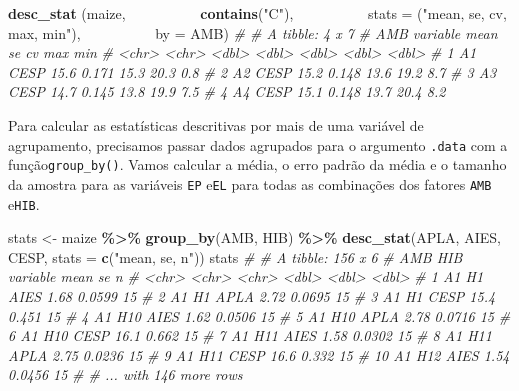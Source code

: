 \documentclass[
]{book}
\makeatletter
\newenvironment{Shaded}{\begin{snugshade}}{\end{snugshade}}
\newcommand{\CommentTok}[1]{\textcolor[rgb]{0.56,0.35,0.01}{\textit{#1}}}
\newcommand{\DataTypeTok}[1]{\textcolor[rgb]{0.13,0.29,0.53}{#1}}
\newcommand{\KeywordTok}[1]{\textcolor[rgb]{0.13,0.29,0.53}{\textbf{#1}}}
\newcommand{\NormalTok}[1]{#1}
\newcommand{\OperatorTok}[1]{\textcolor[rgb]{0.81,0.36,0.00}{\textbf{#1}}}
\newcommand{\StringTok}[1]{\textcolor[rgb]{0.31,0.60,0.02}{#1}}
\numberwithin{equation}{section}
\newcommand{\indf}[1]{\index[function]{#1@\texttt{#1()}|ST}}
\makeatother
\begin{document}
\begin{Shaded}
\begin{Highlighting}[]
\KeywordTok{desc\_stat}\NormalTok{ (maize,}
          \KeywordTok{contains}\NormalTok{(}\StringTok{"C"}\NormalTok{),}
          \DataTypeTok{stats =}\NormalTok{ (}\StringTok{"mean, se, cv, max, min"}\NormalTok{),}
          \DataTypeTok{by =}\NormalTok{ AMB)}
\CommentTok{\# \# A tibble: 4 x 7}
\CommentTok{\#   AMB   variable  mean    se    cv   max   min}
\CommentTok{\#   \textless{}chr\textgreater{} \textless{}chr\textgreater{}    \textless{}dbl\textgreater{} \textless{}dbl\textgreater{} \textless{}dbl\textgreater{} \textless{}dbl\textgreater{} \textless{}dbl\textgreater{}}
\CommentTok{\# 1 A1    CESP      15.6 0.171  15.3  20.3   0.8}
\CommentTok{\# 2 A2    CESP      15.2 0.148  13.6  19.2   8.7}
\CommentTok{\# 3 A3    CESP      14.7 0.145  13.8  19.9   7.5}
\CommentTok{\# 4 A4    CESP      15.1 0.148  13.7  20.4   8.2}
\end{Highlighting}
\end{Shaded}

\indf{desc\_stat}

Para calcular as estatísticas descritivas por mais de uma variável de agrupamento, precisamos passar dados agrupados para o argumento \texttt{.data} com a função\texttt{group\_by()}. Vamos calcular a média, o erro padrão da média e o tamanho da amostra para as variáveis \texttt{EP} e\texttt{EL} para todas as combinações dos fatores \texttt{AMB} e\texttt{HIB}.

\begin{Shaded}
\begin{Highlighting}[]
\NormalTok{stats \textless{}{-}}\StringTok{ }
\NormalTok{maize }\OperatorTok{\%\textgreater{}\%}\StringTok{ }
\StringTok{  }\KeywordTok{group\_by}\NormalTok{(AMB, HIB) }\OperatorTok{\%\textgreater{}\%}\StringTok{ }
\StringTok{  }\KeywordTok{desc\_stat}\NormalTok{(APLA, AIES, CESP,}
            \DataTypeTok{stats =} \KeywordTok{c}\NormalTok{(}\StringTok{"mean, se, n"}\NormalTok{))}
\NormalTok{stats}
\CommentTok{\# \# A tibble: 156 x 6}
\CommentTok{\#    AMB   HIB   variable  mean     se     n}
\CommentTok{\#    \textless{}chr\textgreater{} \textless{}chr\textgreater{} \textless{}chr\textgreater{}    \textless{}dbl\textgreater{}  \textless{}dbl\textgreater{} \textless{}dbl\textgreater{}}
\CommentTok{\#  1 A1    H1    AIES      1.68 0.0599    15}
\CommentTok{\#  2 A1    H1    APLA      2.72 0.0695    15}
\CommentTok{\#  3 A1    H1    CESP     15.4  0.451     15}
\CommentTok{\#  4 A1    H10   AIES      1.62 0.0506    15}
\CommentTok{\#  5 A1    H10   APLA      2.78 0.0716    15}
\CommentTok{\#  6 A1    H10   CESP     16.1  0.662     15}
\CommentTok{\#  7 A1    H11   AIES      1.58 0.0302    15}
\CommentTok{\#  8 A1    H11   APLA      2.75 0.0236    15}
\CommentTok{\#  9 A1    H11   CESP     16.6  0.332     15}
\CommentTok{\# 10 A1    H12   AIES      1.54 0.0456    15}
\CommentTok{\# \# ... with 146 more rows}
\end{Highlighting}
\end{Shaded}
\end{document}
